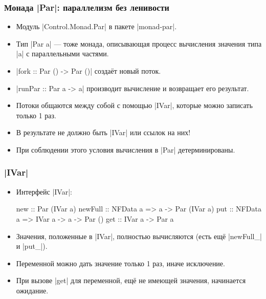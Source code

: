 \documentclass[11pt]{beamer}
\begin{document}
\begin{frame}[fragile]
  \frametitle{Монада \haskinline|Par|: параллелизм без ленивости}
  \begin{itemize}
    \item Модуль \haskinline|Control.Monad.Par| в пакете \haskinline|monad-par|.
    \item Тип \haskinline|Par a| --- тоже монада, описывающая процесс вычисления значения типа \haskinline|a| с параллельными частями.
    \item \haskinline|fork :: Par () -> Par ()| создаёт новый поток.
    \item \haskinline|runPar :: Par a -> a| производит вычисление и возвращает его результат. \pause
    \item Потоки общаются между собой с помощью \haskinline|IVar|, которые можно записать только 1 раз.
    \item В результате не должно быть \haskinline|IVar| или ссылок на них!
    \item При соблюдении этого условия вычисления в \haskinline|Par| детерминированы.
  \end{itemize}
\end{frame}

\begin{frame}[fragile]
  \frametitle{\haskinline|IVar|}
  \begin{itemize}
    \item Интерфейс \haskinline|IVar|:
          \begin{haskell}
            new :: Par (IVar a)
            newFull :: NFData a => a -> Par (IVar a)
            put :: NFData a => IVar a -> a -> Par ()
            get :: IVar a -> Par a
          \end{haskell}
    \item Значения, положенные в \haskinline|IVar|, полностью вычисляются (есть ещё \haskinline|newFull_| и \haskinline|put_|).
    \item Переменной можно дать значение только 1 раз, иначе исключение.
    \item При вызове \haskinline|get| для переменной, ещё не имеющей значения, начинается ожидание.
  \end{itemize}
\end{frame}
\end{document}
